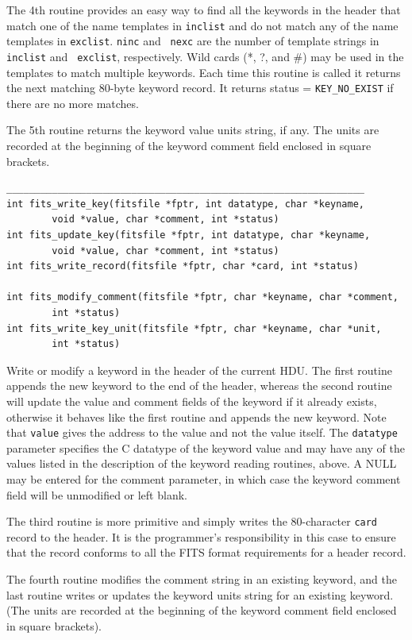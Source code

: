 \documentclass[11pt]{article}
\begin{document}
The 4th routine provides an easy way to find all the keywords in the
header that match one of the name templates in {\tt inclist} and do not
match any of the name templates in {\tt exclist}.  {\tt ninc} and {\tt
nexc} are the number of template strings in {\tt inclist} and {\tt
exclist}, respectively.  Wild cards (*, ?, and \#) may be used in the
templates to match multiple keywords.  Each time this routine is called
it returns the next matching 80-byte keyword record.  It returns status
= {\tt KEY\_NO\_EXIST} if there are no more matches.

The 5th routine returns the keyword value units string, if any.
The units are recorded at the beginning of the keyword comment field
enclosed in square brackets.
\begin{verbatim}
_______________________________________________________________
int fits_write_key(fitsfile *fptr, int datatype, char *keyname,
        void *value, char *comment, int *status)
int fits_update_key(fitsfile *fptr, int datatype, char *keyname,
        void *value, char *comment, int *status)
int fits_write_record(fitsfile *fptr, char *card, int *status)

int fits_modify_comment(fitsfile *fptr, char *keyname, char *comment,
        int *status)
int fits_write_key_unit(fitsfile *fptr, char *keyname, char *unit,
        int *status)

\end{verbatim}

Write or modify a keyword  in the header of the current HDU.  The
first routine appends the new keyword to the end of the header, whereas
the second routine will update the value and comment fields of the
keyword if it already exists, otherwise it behaves like the first
routine and appends the new keyword.  Note that {\tt value} gives the
address to the value and not the value itself.  The {\tt datatype}
parameter specifies the C datatype of the keyword value and may have
any of the values listed in the description of the keyword reading
routines, above.  A NULL may be entered for the comment parameter, in
which case the  keyword comment field will be unmodified or left
blank.

The third routine is more primitive and simply writes the 80-character
{\tt card} record to the header.  It is the programmer's responsibility
in this case to ensure that the record conforms to all the FITS format
requirements for a header record.

The fourth routine modifies the comment string in an existing keyword,
and the last routine writes or updates the keyword units string for an
existing keyword.  (The units are recorded at the beginning of the
keyword comment field enclosed in square brackets).
\end{document}
